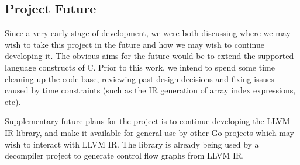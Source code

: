 
\subsection{Project Future}
\label{sec:project_future}

Since a very early stage of development, we were both discussing where we may wish to take this project in the future and how we may wish to continue developing it. The obvious aims for the future would be to extend the supported language constructs of C. Prior to this work, we intend to spend some time cleaning up the code base, reviewing past design decisions and fixing issues caused by time constraints (such as the IR generation of array index expressions, etc).

Supplementary future plans for the project is to continue developing the LLVM IR library, and make it available for general use by other Go projects which may wish to interact with LLVM IR. The library is already being used by a decompiler project to generate control flow graphs from LLVM IR.
